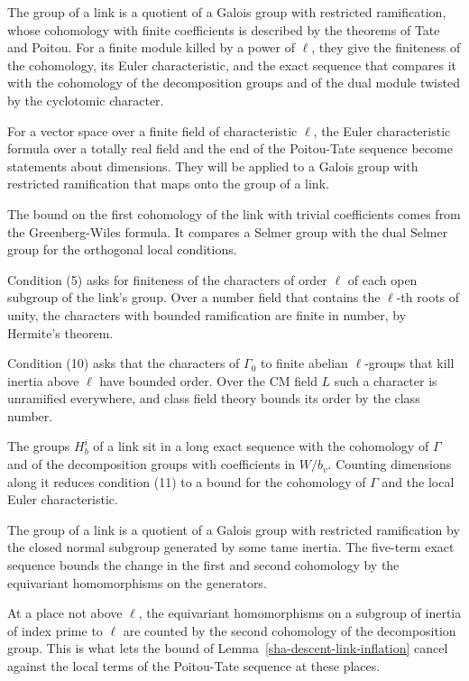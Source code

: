 The group of a link is a quotient of a Galois group with restricted ramification, whose cohomology with finite coefficients is described by the theorems of Tate and Poitou. For a finite module killed by a power of $\ell$, they give the finiteness of the cohomology, its Euler characteristic, and the exact sequence that compares it with the cohomology of the decomposition groups and of the dual module twisted by the cyclotomic character.

For a vector space over a finite field of characteristic $\ell$, the Euler characteristic formula over a totally real field and the end of the Poitou-Tate sequence become statements about dimensions. They will be applied to a Galois group with restricted ramification that maps onto the group of a link.

The bound on the first cohomology of the link with trivial coefficients comes from the Greenberg-Wiles formula. It compares a Selmer group with the dual Selmer group for the orthogonal local conditions.

Condition (5) asks for finiteness of the characters of order $\ell$ of each open subgroup of the link's group. Over a number field that contains the $\ell$-th roots of unity, the characters with bounded ramification are finite in number, by Hermite's theorem.

Condition (10) asks that the characters of $\Gamma_0$ to finite abelian $\ell$-groups that kill inertia above $\ell$ have bounded order. Over the CM field $L$ such a character is unramified everywhere, and class field theory bounds its order by the class number.

The groups $H^i_b$ of a link sit in a long exact sequence with the cohomology of $\Gamma$ and of the decomposition groups with coefficients in $W/b_v$. Counting dimensions along it reduces condition (11) to a bound for the cohomology of $\Gamma$ and the local Euler characteristic.

The group of a link is a quotient of a Galois group with restricted ramification by the closed normal subgroup generated by some tame inertia. The five-term exact sequence bounds the change in the first and second cohomology by the equivariant homomorphisms on the generators.

At a place not above $\ell$, the equivariant homomorphisms on a subgroup of inertia of index prime to $\ell$ are counted by the second cohomology of the decomposition group. This is what lets the bound of Lemma~\ref{sha-descent-link-inflation} cancel against the local terms of the Poitou-Tate sequence at these places.

